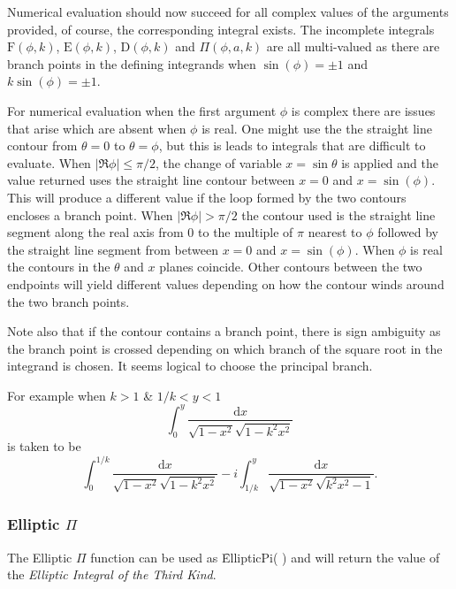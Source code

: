 Numerical evaluation should now succeed for all complex values of the arguments
provided, of course, the corresponding integral exists. The incomplete integrals
$\mathrm{F}(\phi, k)$, $\mathrm{E}(\phi, k)$, $\mathrm{D}(\phi, k)$ and
$\Pi(\phi, a, k)$ are all multi-valued as there are branch points in the
defining integrands  when $\sin(\phi) =\pm 1$ and $k\sin(\phi) = \pm 1$.

For numerical evaluation when the first argument $\phi$ is complex there are issues that
arise which are absent when $\phi$ is real. One might use the the straight line contour
from $\theta=0$ to $\theta=\phi$, but this is leads to integrals that are difficult to
evaluate. When $|\Re{\phi}| \leq \pi/2$, the change of variable $x=\sin \theta$ is applied
and the value returned uses the straight line contour between $x=0$ and $x=\sin(\phi)$.
This will  produce a different value if the loop formed by the two contours encloses a
branch point. When $|\Re{\phi}| > \pi/2$ the contour used is the straight line segment
along the real axis from 0 to the multiple of $\pi$ nearest to $\phi$ followed by the
straight line segment from between $x=0$ and $x=\sin(\phi)$. When $\phi$ is real the
contours in the $\theta$ and $x$ planes coincide. Other contours between the
two endpoints will yield different values depending on how the contour winds around the
two branch points.

Note also that if the contour contains a branch point, there is sign ambiguity as the
branch point is crossed depending on which branch of the square root in the integrand is
chosen. It seems logical to choose the principal branch.

For example when $k>1$ \& $1/k < y <1$
\[ \int_0^y \frac{\mathrm{d}x}{\sqrt{1-x^2}\sqrt{1-k^2x^2}}\]
is taken to be
\[\int_0^{1/k} \frac{\mathrm{d}x}{\sqrt{1-x^2}\sqrt{1-k^2x^2}}
-i\int_{1/k}^y \frac{\mathrm{d}x}{\sqrt{1-x^2}\sqrt{k^2x^2-1}}.\]

\subsubsection{Elliptic $\Pi$}
\hypertarget{operator:ELLIPTICPI}{}
The Elliptic $\Pi$ function can be used as \f{EllipticPi( )} and
will return the value of the \emph{Elliptic Integral of the
Third Kind}.

